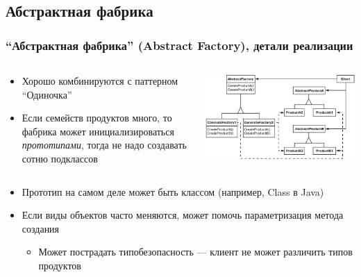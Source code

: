 \documentclass[xetex,mathserif,serif]{beamer}
\begin{document}
    \subsection{Абстрактная фабрика}

    \begin{frame}
        \frametitle{``Абстрактная фабрика'' (Abstract Factory), детали реализации}
        \begin{columns}
            \begin{column}{0.5\textwidth}
                \begin{itemize}
                    \item Хорошо комбинируются с паттерном ``Одиночка''
                    \item Если семейств продуктов много, то фабрика может инициализироваться \textit{прототипами}, тогда не надо создавать сотню подклассов
                \end{itemize}
            \end{column}
            \begin{column}{0.5\textwidth}
                \begin{center}
                    \includegraphics[width=\textwidth]{abstractFactory.png}
                \end{center}
            \end{column}
        \end{columns}
        \begin{itemize}
            \item Прототип на самом деле может быть классом (например, Class в Java)
            \item Если виды объектов часто меняются, может помочь параметризация метода создания
            \begin{itemize}
                \item Может пострадать типобезопасность --- клиент не может различить типов продуктов
            \end{itemize}
        \end{itemize}
    \end{frame}
\end{document}
